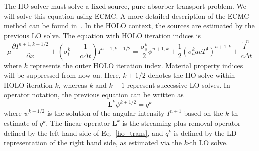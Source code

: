 \documentclass{mc2013}
\newcommand{\pderiv}[2]{\frac{\partial #1}{\partial #2}}
\newcommand{\B}[1]{\ensuremath{\mathbf{#1}}}
\begin{document}

The HO solver must solve a fixed source, pure absorber transport
problem.  We will solve this equation using ECMC. A more detailed description of the
ECMC method can be found in~\cite{jake_thesis}. In the
HOLO context, the sources are estimated by the previous LO solve.
The equation with HOLO iteration indices is
\begin{equation}
\mu \pderiv{I^{n+1,k+1/2}}{x} + \left(\sigma_t^k + \frac{1}{c \Delta t }\right)
I^{n+1,k+1/2}
= \frac{\sigma_s^k}{2} \phi^{n+1,k} +\frac{1}{2} \left(\sigma_a^k a c T^4
\right)^{n+1,k} + \frac{\tilde I^n}{c\Delta t} 
\end{equation}
where $k$ represents the outer HOLO iteration index.  Material property indices will be
suppressed from now on.  Here, $k+1/2$ denotes the
HO solve within HOLO iteration $k$, whereas $k$ and $k+1$ represent successive LO
solves.  In operator notation, the previous equation can be written as
\begin{equation}\label{te_oper}
\B L^k \psi^{k+1/2}  = q^{k}
\end{equation}
where $\psi^{k+1/2}$ is the solution of the angular intensity $I^{n+1}$ based on the $k$-th
estimate of $q^k$.
The linear operator $\B L^k$ is the streaming plus
removal operator defined by the left hand
side of Eq.~\eqref{ho_trans}, and $q^k$ is defined by the LD representation of the
right hand side, as estimated via the $k$-th LO solve.  
\end{document}
